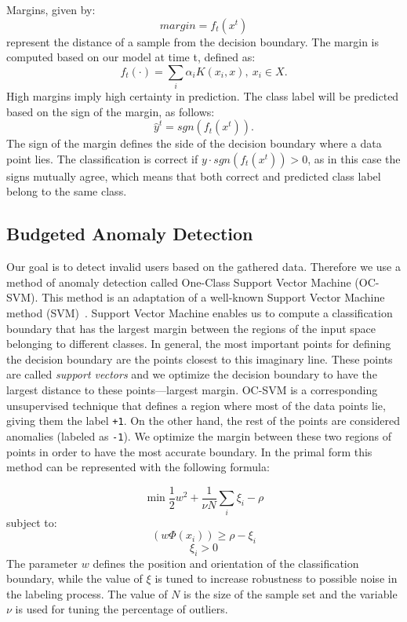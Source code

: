 \documentclass{llncs}
\begin{document}
\noindent Margins, given by:
\begin{equation}\label{eq:margin}
margin = f_{t}(x^{t})
\end{equation}
 represent the distance of a sample from the decision boundary. The margin is computed based on our model at time t, defined as:
\begin{equation}\label{eq:model}
f_{t}(\cdot) = \sum_{i} \alpha_{i} K(x_{i},x), \: x_{i} \in X.
\end{equation} 
High margins imply high certainty in prediction. The class label will be predicted based on the sign of the margin, as follows:
\begin{equation}\label{eq:predict}
\hat{{y}}^{t} = sgn(f_{t}(x^{t})).
\end{equation}
The sign of the margin defines the side of the decision boundary where a data point lies. The classification is correct if $y \cdot sgn(f_{t}(x^{t})) > 0$, as in this case the signs mutually agree, which means that both correct and predicted class label belong to the same class. 

\subsection{Budgeted Anomaly Detection}

Our goal is to detect invalid users based on the gathered data. Therefore we use a method of anomaly detection called One-Class Support Vector Machine (OC-SVM)\cite{scholkopf2000support}. This method is an adaptation of a well-known Support Vector Machine method (SVM)~\cite{vapnik2013nature}. Support Vector Machine enables us to compute a classification boundary that has the largest margin between the regions of the input space belonging to different classes. In general, the most important points for defining the decision boundary are the points closest to this imaginary line. These points are called \textit{support vectors} and we optimize the decision boundary to have the largest distance to these points---largest margin. OC-SVM is a corresponding unsupervised technique that defines a region where most of the data points lie, giving them the label \texttt{+1}. On the other hand, the rest of the points are considered anomalies (labeled as \texttt{-1}). We optimize the margin between these two regions of points in order to have the most accurate boundary. In the primal form this method can be represented with the following formula:

\begin{equation}
\min \frac{1}{2} {w}^2 + \frac{1}{\nu N} \sum_{i} \xi_i - \rho 
\end{equation}
subject to:
\begin{equation}
 (w \Phi (x_i)) \geq  \rho -\xi_i
\end{equation}
\begin{equation}
\xi_i>0
\end{equation}
%
The parameter $w$ defines the position and orientation of the classification boundary, while the value of $\xi$ is tuned to increase robustness to possible noise in the labeling process. The value of $N$ is the size of the sample set and the variable $\nu$ is used for tuning the percentage of outliers.
\end{document}
